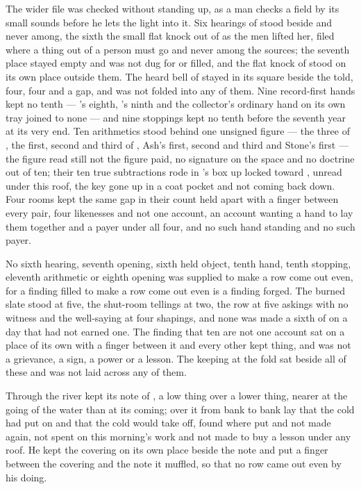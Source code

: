 The wider file was checked without standing up, as a man checks a field by its small sounds before he lets the light into it. Six hearings of  stood beside and never among, the sixth the small flat knock out of  as the men lifted her, filed where a thing out of a person must go and never among the sources; the seventh place stayed empty and was not dug for or filled, and the flat knock of  stood on its own place outside them. The heard bell of  stayed in its square beside the told, four, four and a gap, and was not folded into any of them. Nine record-first hands kept no tenth — 's eighth, 's ninth and the collector's ordinary hand on its own tray joined to none — and nine stoppings kept no tenth before the seventh year at its very end. Ten arithmetics stood behind one unsigned figure — the three of , the first, second and third of , Ash's first, second and third and Stone's first — the figure read still not the figure paid, no signature on the space and no doctrine out of ten; their ten true subtractions rode in 's box up  locked toward , unread under this roof, the key gone up in a coat pocket and not coming back down. Four rooms kept the same gap in their count held apart with a finger between every pair, four likenesses and not one account, an account wanting a hand to lay them together and a payer under all four, and no such hand standing and no such payer.

No sixth hearing, seventh opening, sixth held object, tenth hand, tenth stopping, eleventh arithmetic or eighth opening was supplied to make a row come out even, for a finding filled to make a row come out even is a finding forged. The burned slate stood at five, the shut-room tellings at two, the row at five askings with no witness and the well-saying at four shapings, and none was made a sixth of on a day that had not earned one. The finding that ten are not one account sat on a place of its own with a finger between it and every other kept thing, and was not a grievance, a sign, a power or a lesson. The keeping at the fold sat beside all of these and was not laid across any of them.

\scenebreak

Through  the river kept its note of , a low thing over a lower thing, nearer at the going of the water than at its coming; over it from bank to bank lay  that the cold had put on and that the cold would take off, found where put and not made again, not spent on this morning's work and not made to buy a lesson under any roof. He kept the covering on its own place beside the note and put a finger between the covering and the note it muffled, so that no row came out even by his doing.


